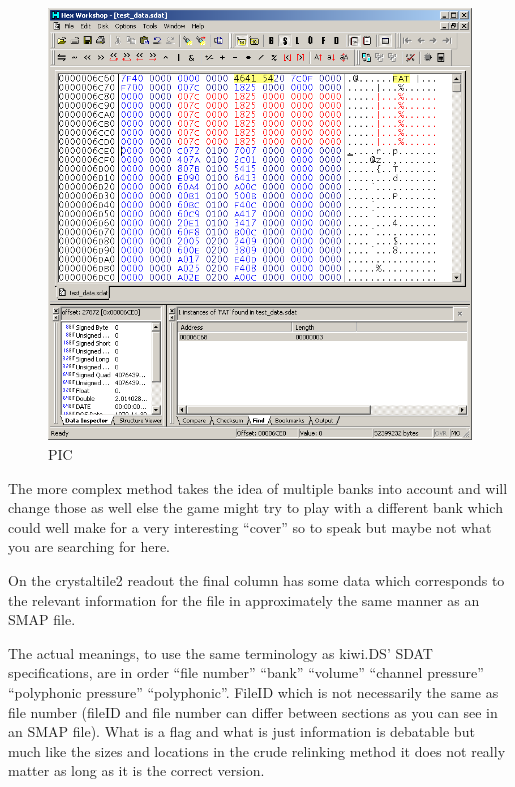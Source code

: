 \documentclass[
]{book}
\begin{document}
\begin{figure}
\centering
\includegraphics{images/141_home_fast6191_romhackingguide_unrenamed_files_and_original_borders_relinkinghexworkshop2.png}
\caption{PIC}
\end{figure}

The more complex method takes the idea of multiple banks into account and will change those as well else the game might try to play with a different bank which could well make for a very interesting ``cover'' so to speak but maybe not what you are searching for here.

On the crystaltile2 readout the final column has some data which corresponds to the relevant information for the file in approximately the same manner as an SMAP file.

The actual meanings, to use the same terminology as kiwi.DS' SDAT specifications, are in order ``file number'' ``bank'' ``volume'' ``channel pressure'' ``polyphonic pressure'' ``polyphonic''. FileID which is not necessarily the same as file number (fileID and file number can differ between sections as you can see in an SMAP file). What is a flag and what is just information is debatable but much like the sizes and locations in the crude relinking method it does not really matter as long as it is the correct version.
\end{document}
